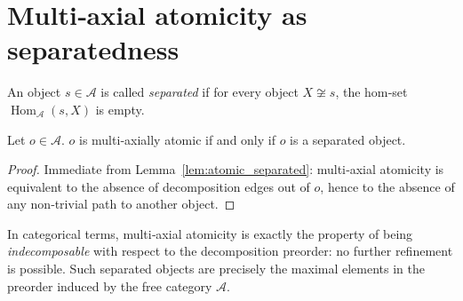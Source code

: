 \section{Multi‑axial atomicity as separatedness}\label{sec:separated}

\begin{definition}
An object $s \in \mathcal{A}$ is called \emph{separated} if for every object $X \not\cong s$, the hom‑set $\operatorname{Hom}_{\mathcal{A}}(s,X)$ is empty.
\end{definition}

\begin{theorem}\label{th:separated}
Let $o \in \mathcal{A}$.  $o$ is multi‑axially atomic if and only if $o$ is a separated object.
\end{theorem}
\begin{proof}
Immediate from Lemma~\ref{lem:atomic_separated}: multi‑axial atomicity is equivalent to the absence of decomposition edges out of $o$, hence to the absence of any non‑trivial path to another object.
\end{proof}

In categorical terms, multi‑axial atomicity is exactly the property of being \emph{indecomposable} with respect to the decomposition preorder: no further refinement is possible.
Such separated objects are precisely the maximal elements in the preorder induced by the free category $\mathcal{A}$.